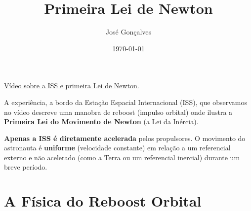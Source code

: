 \documentclass[a4paper,12pt]{article}
\title{Primeira Lei de Newton}
\author{José Gonçalves}
\date{\today}
\begin{document}
	\maketitle
	
	
	\href{https://www.youtube.com/watch?v=-luKN6mad5w&t=58s}{Vídeo sobre a ISS e primeira Lei de Newton.}
	
	A experiência, a bordo da Estação Espacial Internacional (ISS), que observamos no vídeo descreve  uma manobra de reboost (impulso orbital) onde ilustra a \textbf{Primeira Lei do Movimento de Newton} (a Lei da Inércia).
	
	\textbf{Apenas a ISS é diretamente acelerada} pelos propulsores. O movimento do astronauta é \textbf{uniforme} (velocidade constante) em relação a um referencial externo e não acelerado (como a Terra ou um referencial inercial) durante um breve período.
	
	\section*{A Física do Reboost Orbital}
	
\end{document}
